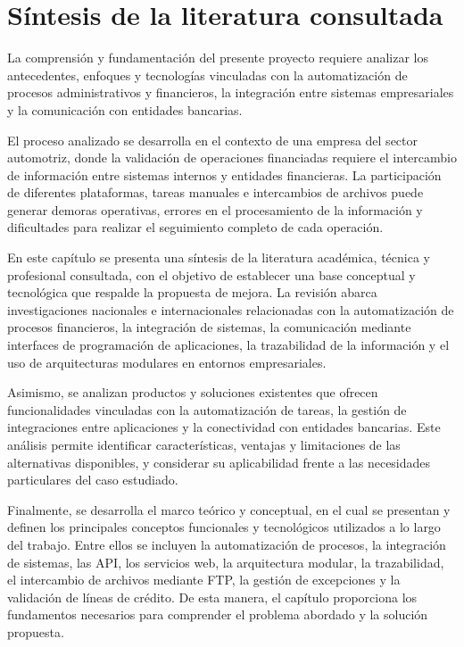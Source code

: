 \chapter{Síntesis de la literatura consultada}\label{cap:marco-teorico}

La comprensión y fundamentación del presente proyecto requiere analizar los antecedentes, enfoques y tecnologías vinculadas con la automatización de procesos administrativos y financieros, la integración entre sistemas empresariales y la comunicación con entidades bancarias.

El proceso analizado se desarrolla en el contexto de una empresa del sector automotriz, donde la validación de operaciones financiadas requiere el intercambio de información entre sistemas internos y entidades financieras. La participación de diferentes plataformas, tareas manuales e intercambios de archivos puede generar demoras operativas, errores en el procesamiento de la información y dificultades para realizar el seguimiento completo de cada operación.

En este capítulo se presenta una síntesis de la literatura académica, técnica y profesional consultada, con el objetivo de establecer una base conceptual y tecnológica que respalde la propuesta de mejora. La revisión abarca investigaciones nacionales e internacionales relacionadas con la automatización de procesos financieros, la integración de sistemas, la comunicación mediante interfaces de programación de aplicaciones, la trazabilidad de la información y el uso de arquitecturas modulares en entornos empresariales.

Asimismo, se analizan productos y soluciones existentes que ofrecen funcionalidades vinculadas con la automatización de tareas, la gestión de integraciones entre aplicaciones y la conectividad con entidades bancarias. Este análisis permite identificar características, ventajas y limitaciones de las alternativas disponibles, y considerar su aplicabilidad frente a las necesidades particulares del caso estudiado.

Finalmente, se desarrolla el marco teórico y conceptual, en el cual se presentan y definen los principales conceptos funcionales y tecnológicos utilizados a lo largo del trabajo. Entre ellos se incluyen la automatización de procesos, la integración de sistemas, las API, los servicios web, la arquitectura modular, la trazabilidad, el intercambio de archivos mediante FTP, la gestión de excepciones y la validación de líneas de crédito. De esta manera, el capítulo proporciona los fundamentos necesarios para comprender el problema abordado y la solución propuesta.

